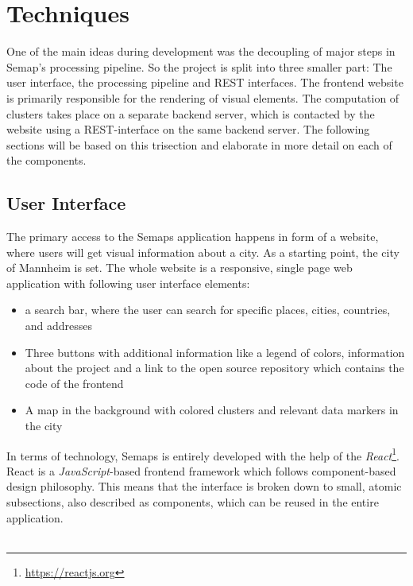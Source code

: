 \section{Techniques}
One of the main ideas during development was the decoupling of major steps in Semap’s processing pipeline. So the project is split into three smaller part: The user interface, the processing pipeline and REST interfaces. 
The frontend website is primarily responsible for the rendering of visual elements. The computation of clusters takes place on a separate backend server, which is contacted by the website using a REST-interface on the same backend server. The following sections will be based on this trisection and elaborate in more detail on each of the components.

\subsection{User Interface}
The primary access to the Semaps application happens in form of a website, where users will get visual information about a city. As a starting point, the city of Mannheim is set. The whole website is a responsive, single page web application with following user interface elements: 
\begin{itemize}
\item a search bar, where the user can search for specific places, cities, countries, and addresses
\item Three buttons with additional information like a legend of colors, information about the project and a link to the open source repository which contains the code of the frontend
\item A map in the background with colored clusters and relevant data markers in the city
\end{itemize}

In terms of technology, Semaps is entirely developed with the help of the \textit{React}\footnote{ \url{https://reactjs.org}}. React is a \textit{JavaScript}-based frontend framework which follows component-based design philosophy. This means that the interface is broken down to small, atomic subsections, also described as components, which can be reused in the entire application.
\\ \\ 


